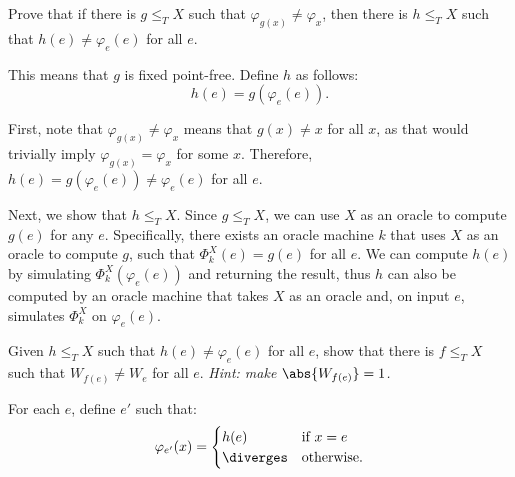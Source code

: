 \begin{problem}
  \begin{enumalph}
    \item Prove that if there is $g \leq_T X$ such that
      $\varphi_{g(x)} \neq \varphi_x$, then there is
      $h \leq_T X$ such that $h(e) \neq \varphi_e(e)$
      for all $e$.

      \begin{answer}
        This means that $g$ is fixed point-free.
        Define $h$ as follows:
        \[
          h(e) = g(\varphi_e(e)).
        \]

        \begin{enumarabic}
          \item First, note that $\varphi_{g(x)} \neq \varphi_x$
            means that $g(x) \neq x$ for all $x$,
            as that would trivially imply $\varphi_{g(x)} = \varphi_x$
            for some $x$.
            Therefore, $h(e) = g(\varphi_e(e)) \neq \varphi_e(e)$
            for all $e$.
          \item Next, we show that $h \leq_T X$.
            Since $g \leq_T X$, we can use $X$ as an oracle to compute $g(e)$
            for any $e$. Specifically, there exists an oracle machine $k$
            that uses $X$ as an oracle to compute $g$, such that
            $\Phi_k^X(e) = g(e)$ for all $e$.
            We can compute $h(e)$ by simulating $\varPhi_k^X(\varphi_e(e))$
            and returning the result, thus $h$ can also be computed
            by an oracle machine that takes $X$ as an oracle
            and, on input $e$, simulates $\varPhi_k^X$ on $\varphi_e(e)$.
        \end{enumarabic}
      \end{answer}

    \item Given $h \leq_T X$ such that $h(e) \neq \varphi_e(e)$ for all $e$,
      show that there is $f \leq_T X$ such that $W_{f(e)} \neq W_e$
      for all $e$. \newline
      \emph{Hint: make $\abs{W_{f(e)}} = 1$.}

      \begin{answer}

        For each $e$, define $e'$ such that:
        \[
          \varphi_{e'}(x) = \begin{cases}
            h(e) & \text{if } x = e \\
            \diverges & \text{otherwise.}
          \end{cases}
        \]


\end{answer}
\end{enumalph}
\end{problem}
